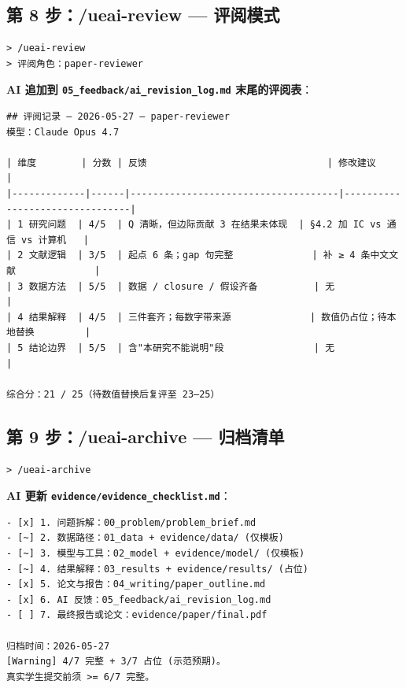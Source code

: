 \documentclass[12pt,a4paper]{article}
\begin{document}
\subsection{第 8 步：/ueai-review — 评阅模式}

\begin{lstlisting}[style=prompt]
> /ueai-review
> 评阅角色：paper-reviewer
\end{lstlisting}

\noindent\textbf{AI 追加到 \texttt{05\_feedback/ai\_revision\_log.md} 末尾的评阅表}：
\begin{lstlisting}[style=md]
## 评阅记录 — 2026-05-27 — paper-reviewer
模型：Claude Opus 4.7

| 维度        | 分数 | 反馈                                | 修改建议                       |
|-------------|------|-------------------------------------|--------------------------------|
| 1 研究问题  | 4/5  | Q 清晰，但边际贡献 3 在结果未体现  | §4.2 加 IC vs 通信 vs 计算机   |
| 2 文献逻辑  | 3/5  | 起点 6 条；gap 句完整              | 补 ≥ 4 条中文文献              |
| 3 数据方法  | 5/5  | 数据 / closure / 假设齐备          | 无                             |
| 4 结果解释  | 4/5  | 三件套齐；每数字带来源              | 数值仍占位；待本地替换         |
| 5 结论边界  | 5/5  | 含"本研究不能说明"段                | 无                             |

综合分：21 / 25（待数值替换后复评至 23–25）
\end{lstlisting}

\subsection{第 9 步：/ueai-archive — 归档清单}

\begin{lstlisting}[style=prompt]
> /ueai-archive
\end{lstlisting}

\noindent\textbf{AI 更新 \texttt{evidence/evidence\_checklist.md}}：
\begin{lstlisting}[style=md]
- [x] 1. 问题拆解：00_problem/problem_brief.md
- [~] 2. 数据路径：01_data + evidence/data/ (仅模板)
- [~] 3. 模型与工具：02_model + evidence/model/ (仅模板)
- [~] 4. 结果解释：03_results + evidence/results/ (占位)
- [x] 5. 论文与报告：04_writing/paper_outline.md
- [x] 6. AI 反馈：05_feedback/ai_revision_log.md
- [ ] 7. 最终报告或论文：evidence/paper/final.pdf

归档时间：2026-05-27
[Warning] 4/7 完整 + 3/7 占位 (示范预期)。
真实学生提交前须 >= 6/7 完整。
\end{lstlisting}
\end{document}
